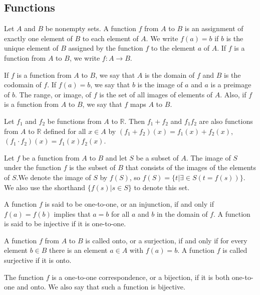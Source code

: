 \newpage
\subsection{Functions}

\begin{defn}[function]
Let $A$ and $B$ be nonempty sets. A function $f$ from $A$ to $B$ is an assignment of exactly one
element of $B$ to each element of $A$. We write $f (a) = b$ if $b$ is the unique element of $B$
assigned by the function $f$ to the element $a$ of $A$. If $f$ is a function from $A$ to $B$, we write
$f : A \to B$.
\end{defn}
\begin{defn}
If $f$ is a function from $A$ to $B$, we say that $A$ is the domain of $f$ and $B$ is the codomain of $f$.
If $f (a) = b$, we say that $b$ is the image of $a$ and $a$ is a preimage of $b$. The range, or image,
of $f$ is the set of all images of elements of $A$. Also, if $f$ is a function from $A$ to $B$, we say
that $f$ maps $A$ to $B$.
\end{defn}
\begin{defn}
Let $f_1$ and $f_2$ be functions from $A$ to $\mathbb{R}$. Then $f_1 + f_2$ and $f_1f_2$ are also functions from $A$
to $\mathbb{R}$ defined for all $x \in A$ by
$(f_1 + f_2)(x) = f_1(x) + f_2(x)$,
$(f_1\cdot f_2)(x) = f_1(x)f_2(x)$.
\end{defn}
\begin{defn}[image]
Let $f$ be a function from $A$ to $B$ and let $S$ be a subset of $A$. The image of $S$ under the function
$f$ is the subset of $B$ that consists of the images of the elements of $S$.We denote the image of
$S$ by $f (S)$, so
$f (S) = \{t | \exists \in S (t = f (s))\}$.
We also use the shorthand $\{f (s) | s \in S\}$ to denote this set.
\end{defn}
\begin{defn}[injective]
A function $f$ is said to be one-to-one, or an injunction, if and only if $f (a) = f (b)$ implies that
$a = b$ for all $a$ and $b$ in the domain of $f$. A function is said to be injective if it is one-to-one.
\end{defn}

\begin{defn}[onto]
A function $f$ from $A$ to $B$ is called onto, or a surjection, if and only if for every element
$b \in B$ there is an element $a \in A$ with $f (a) = b$. A function $f$ is called surjective if it is onto.
\end{defn}
\begin{defn}[bijection]
The function $f$ is a one-to-one correspondence, or a bijection, if it is both one-to-one and
onto. We also say that such a function is bijective.
\end{defn}

